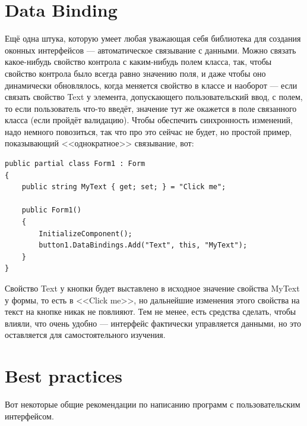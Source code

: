 \documentclass[a5paper]{article}
\begin{document}
\section{Data Binding}

Ещё одна штука, которую умеет любая уважающая себя библиотека для создания оконных интерфейсов --- автоматическое связывание с данными. Можно связать какое-нибудь свойство контрола с каким-нибудь полем класса, так, чтобы свойство контрола было всегда равно значению поля, и даже чтобы оно динамически обновлялось, когда меняется свойство в классе и наоборот --- если связать свойство Text у элемента, допускающего пользовательский ввод, с полем, то если пользователь что-то введёт, значение тут же окажется в поле связанного класса (если пройдёт валидацию). Чтобы обеспечить синхронность изменений, надо немного повозиться, так что про это сейчас не будет, но простой пример, показывающий <<однократное>> связывание, вот:

\begin{verbatim}
public partial class Form1 : Form
{
    public string MyText { get; set; } = "Click me";

    public Form1()
    {
        InitializeComponent();
        button1.DataBindings.Add("Text", this, "MyText");
    }
}
\end{verbatim}

Свойство Text у кнопки будет выставлено в исходное значение свойства MyText у формы, то есть в <<Click me>>, но дальнейшие изменения этого свойства на текст на кнопке никак не повлияют. Тем не менее, есть средства сделать, чтобы влияли, что очень удобно --- интерфейс фактически управляется данными, но это оставляется для самостоятельного изучения.

\section{Best practices}

Вот некоторые общие рекомендации по написанию программ с пользовательским интерфейсом.
\end{document}

